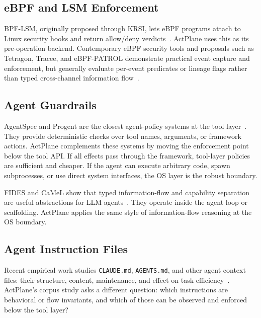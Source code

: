 \subsection{eBPF and LSM Enforcement}

BPF-LSM, originally proposed through KRSI, lets eBPF programs attach to Linux
security hooks and return allow/deny verdicts~\cite{singh2019krsi,linuxbpflsm}.
ActPlane uses this as its pre-operation backend. Contemporary eBPF security
tools and proposals such as Tetragon, Tracee, and eBPF-PATROL demonstrate
practical event capture and enforcement, but generally evaluate per-event
predicates or lineage flags rather than typed cross-channel information
flow~\cite{ciliumtetragon,aquasecuritytracee,ghimire2025ebpfpatrol}.

\subsection{Agent Guardrails}

AgentSpec and Progent are the closest agent-policy systems at the tool
layer~\cite{wang2025agentspec,shi2025progent}. They provide deterministic
checks over tool names, arguments, or framework actions. ActPlane complements
these systems by moving the enforcement point below the tool API. If all
effects pass through the framework, tool-layer policies are sufficient and
cheaper. If the agent can execute arbitrary code, spawn subprocesses, or use
direct system interfaces, the OS layer is the robust boundary.

FIDES and CaMeL show that typed information-flow and capability separation are
useful abstractions for LLM agents~\cite{costa2025fides,debenedetti2025camel}.
They operate inside the agent loop or scaffolding. ActPlane applies the same
style of information-flow reasoning at the OS boundary.

\subsection{Agent Instruction Files}

Recent empirical work studies \texttt{CLAUDE.md}, \texttt{AGENTS.md}, and other
agent context files: their structure, content, maintenance, and effect on task
efficiency~\cite{chatlatanagulchai2025manifests,chatlatanagulchai2025agentreadmes,
santos2025claudeconfig,lulla2026agentsmd}. ActPlane's corpus study asks a
different question: which instructions are behavioral or flow invariants, and
which of those can be observed and enforced below the tool layer?


